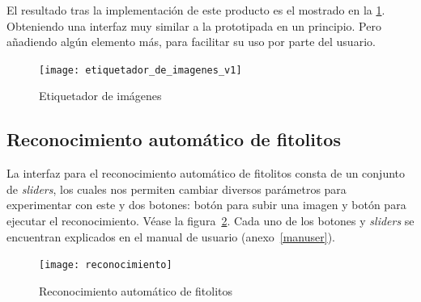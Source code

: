 El resultado tras la implementación de este producto es el mostrado en la \ref{fig:C.5.3}. Obteniendo una interfaz muy similar a la prototipada en un principio. Pero añadiendo algún elemento más, para facilitar su uso por parte del usuario.

\begin{figure}
\centering
\texttt{[image: etiquetador\_de\_imagenes\_v1]}
\caption{Etiquetador de imágenes}
\label{fig:C.5.3}
\end{figure}

\subsection{Reconocimiento automático de fitolitos}

La interfaz para el reconocimiento automático de fitolitos consta de un conjunto de \textit{sliders}, los cuales nos permiten cambiar diversos parámetros para experimentar con este y dos botones: botón para subir una imagen y botón para ejecutar el reconocimiento. Véase la figura~\ref{fig:C.5.4}. Cada uno de los botones y \textit{sliders} se encuentran explicados en el manual de usuario (anexo~\ref{manuser}).

\begin{figure}
\centering
\texttt{[image: reconocimiento]}
\caption{Reconocimiento automático de fitolitos}
\label{fig:C.5.4}
\end{figure}